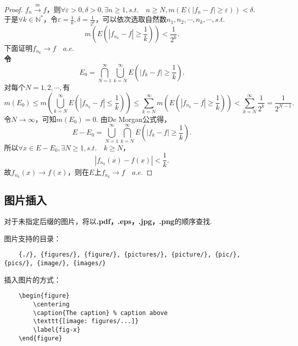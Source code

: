 \documentclass[bwprint, withouttitlepage]{mathexpthesis}
\begin{document}
\begin{proof}
    $f_n \stackrel{m}{\longrightarrow} f$，则$\forall \varepsilon > 0, \delta > 0, \exists n \geqslant 1, s.t. \quad n \geqslant N, m(E(|f_n - f| \geqslant \varepsilon)) < \delta$.
    于是$\forall k \in \mathbb{N}^*$，令$\varepsilon = \frac{1}{k}, \delta = \frac{1}{2^k}$，可以依次选取自然数$n_1, n_2, \cdots, n_k, \cdots, s.t.$
    \begin{equation*}
        m(E(|f_{n_k} - f| \geqslant \frac{1}{k})) < \frac{1}{2^k}.
    \end{equation*}
    下面证明$f_{n_k} \to f \quad a.e.$ \\
    \textbf{令\[E_0 = \bigcap_{N = 1}^{\infty}{\bigcup_{k = N}^{\infty}{E(|f_k - f| \geqslant \frac{1}{k})}}.\]}
    对每个$N = 1, 2, \cdots, $有
    \begin{equation*}
        m(E_0) \leqslant m(\bigcup_{k = N}^{\infty}{E(|f_{n_k} - f| \leqslant \frac{1}{k})}) \leqslant \sum_{k = N}^{\infty}{m(E(|f_{n_k} - f| \geqslant \frac{1}{k}))} < \sum_{k = N}^{\infty}{\frac{1}{2^k}} = \frac{1}{2^{N - 1}}.
    \end{equation*}
    令$N \to \infty$，可知$m(E_0) = 0$.
    由De Morgan公式得，
    \begin{equation*}
        E - E_0 = \bigcup_{N = 1}^{\infty}{\bigcap_{k = N}^{\infty}{E(|f_k - f| \geqslant \frac{1}{k})}}.
    \end{equation*}
    所以$\forall x \in E - E_0, \exists N \geqslant 1, s.t. \quad k \geqslant N$，
    \begin{equation*}
        |f_{n_k}(x) - f(x)| < \frac{1}{k}.
    \end{equation*}
    故$f_{n_k}(x) \to f(x)$，则在$E$上$f_{n_k} \to f \quad a.e.$
\end{proof}

\subsection{图片插入}
对于未指定后缀的图片，将以\textbf{.pdf，.eps，.jpg，.png}的顺序查找.

图片支持的目录：
\begin{verbatim}
    {./}, {figures/}, {figure/}, {pictures/}, {picture/}, {pic/}, {pics/}, {image/}, {images/}
\end{verbatim}

插入图片的方式：
\begin{verbatim}
    \begin{figure}
        \centering
        \caption{The caption} % caption above
        \texttt{[image: figures/...]}
        \label{fig-x}
    \end{figure}
\end{verbatim}
\end{document}
